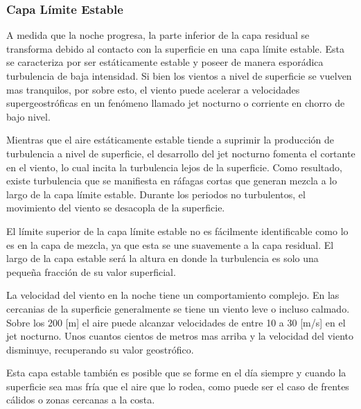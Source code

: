 \subsubsection{Capa Límite Estable}
A medida que la noche progresa, la parte inferior de la capa residual se transforma debido al contacto con la superficie en una capa límite estable. Esta se caracteriza por ser estáticamente estable y poseer de manera esporádica turbulencia de baja intensidad. Si bien los vientos a nivel de superficie se vuelven mas tranquilos, por sobre esto, el viento puede acelerar a velocidades supergeostróficas en un fenómeno llamado jet nocturno o corriente en chorro de bajo nivel.

Mientras que el aire estáticamente estable tiende a suprimir la producción de turbulencia a nivel de superficie, el desarrollo del jet nocturno fomenta el cortante en el viento, lo cual incita la turbulencia lejos de la superficie. Como resultado, existe turbulencia que se manifiesta en ráfagas cortas que generan mezcla a lo largo de la capa límite estable. Durante los periodos no turbulentos, el movimiento del viento se desacopla de la superficie.

El límite superior de la capa límite estable no es fácilmente identificable como lo es en la capa de mezcla, ya que esta se une suavemente a la capa residual. El largo de la capa estable será la altura en donde la turbulencia es solo una pequeña fracción de su valor superficial.

La velocidad del viento en la noche tiene un comportamiento complejo. En las cercanias de la superficie generalmente se tiene un viento leve o incluso calmado. Sobre los 200 [m] el aire puede alcanzar velocidades de entre 10 a 30 [m/s] en el jet nocturno. Unos cuantos cientos de metros mas arriba y la velocidad del viento disminuye, recuperando su valor geostrófico.

Esta capa estable también es posible que se forme en el día siempre y cuando la superficie sea mas fría que el aire que lo rodea, como puede ser el caso de frentes cálidos o zonas cercanas a la costa.
